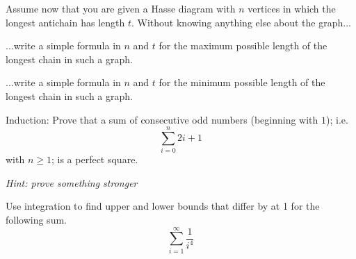 \documentclass[12pt,oneside]{article}
\begin{document}
\begin{problem}{20}

\eparts

Assume now that you are given a Hasse diagram with $n$ vertices in which the longest antichain has length $t$. Without knowing anything else about the graph...

\bparts
{} ...write a simple formula in $n$ and $t$ for the maximum possible length of the longest chain in such a graph.



 ...write a simple formula in $n$ and $t$ for the minimum possible length of the longest chain in such a graph.

\eparts
\end{problem}

\newpage





\begin{problem}{0}
Induction: Prove that a sum of consecutive odd numbers (beginning with $1$); i.e. $$\sum_{i=0}^{n}2i+1$$ with $n \ge 1$; is a perfect square.

\emph{Hint: prove something stronger}
\end{problem}





\newpage


\begin{problem}{10}
Use integration to find upper and lower bounds that differ by at 1 for the following sum.
%
\[
\sum_{i=1}^{\infty} \frac{1}{i^4}
\]

\end{problem}
\end{document}
